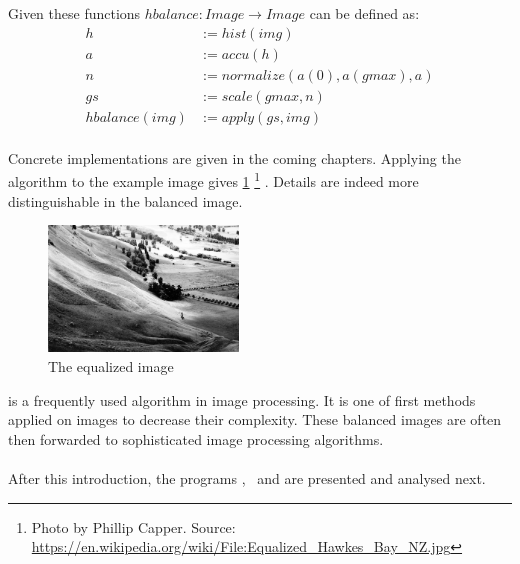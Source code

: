       Given these functions $hbalance: Image \rightarrow Image$ can be defined as:
      \begin{equation*}
      \begin{split}
          h & := hist(img) \\
          a & := accu(h) \\
          n & := normalize(a(0), a(gmax), a) \\
          gs & := scale(gmax,n) \\
        hbalance(img) & := apply(gs,img) \\
      \end{split}
      \end{equation*}
      
      Concrete implementations are given in the coming chapters.
      Applying the algorithm to the example image gives \ref{fig:img-eq}
      \footnote{Photo by Phillip Capper. Source: \url{https://en.wikipedia.org/wiki/File:Equalized_Hawkes_Bay_NZ.jpg}}
      . Details are indeed more distinguishable in the balanced image.
      
      \begin{figure}[h]
        \centering
        \includegraphics[width=0.45\textwidth]{img-eq}
        \caption{The equalized image}
        \label{fig:img-eq}
      \end{figure}
    
  \algo{} is a frequently used algorithm in image processing. It is 
  one of first methods applied on images to decrease their complexity.
  These balanced images are often then forwarded to sophisticated
  image processing algorithms.
  
  
  \paragraph{}
  After this introduction,
  the programs \seq, \man\, \ndpn and \ndpv are presented and analysed next.
  
    
